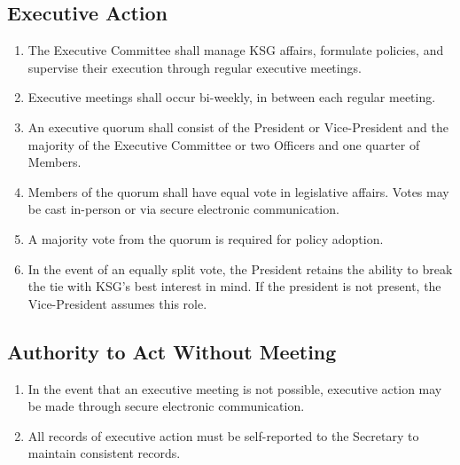 \documentclass[12pt,executivepaper]{article}
\begin{document}
\subsection{Executive Action}
\begin{enumerate}
    \item The Executive Committee shall manage KSG affairs, formulate policies, and supervise
          their execution through regular executive meetings.
    \item Executive meetings shall occur bi-weekly, in between each regular meeting.
    \item An executive quorum shall consist of the President or Vice-President and the
          majority of the Executive Committee or two Officers and one quarter of Members.
    \item Members of the quorum shall have equal vote in legislative affairs.
          Votes may be cast in-person or via secure electronic communication.
    \item A majority vote from the quorum is required for policy adoption.
    \item In the event of an equally split vote, the President retains the ability to
          break the tie with KSG's best interest in mind. If the president is not present,
          the Vice-President assumes this role.
\end{enumerate}

\subsection{Authority to Act Without Meeting}
\begin{enumerate}
    \item In the event that an executive meeting is not possible, executive action
          may be made through secure electronic communication.
    \item All records of executive action must be self-reported to the Secretary to
          maintain consistent records.
\end{enumerate}
\end{document}
